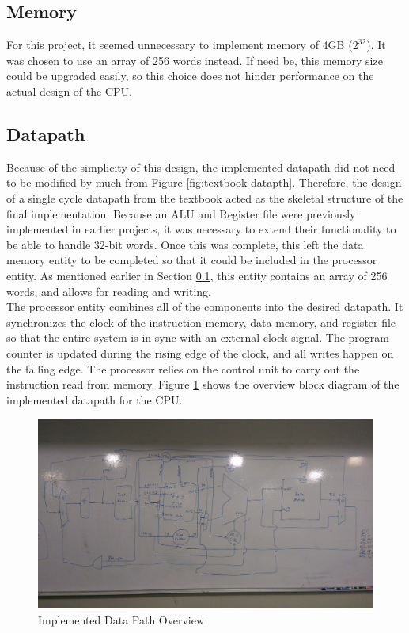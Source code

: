 \documentclass[12pt]{article}
\begin{document}
\subsection{Memory}\label{sec:memory}
For this project, it seemed unnecessary to implement memory of 4GB ($2^{32}$). It was chosen to use an array of 256 words instead. If need be, this memory size could be upgraded easily, so this choice does not hinder performance on the actual design of the CPU.
\subsection{Datapath}
Because of the simplicity of this design, the implemented datapath did not need to be modified by much from Figure \ref{fig:textbook-datapth}. Therefore, the design of a single cycle datapath from the textbook acted as the skeletal structure of the final implementation. Because an ALU and Register file were previously implemented in earlier projects, it was necessary to extend their functionality to be able to handle 32-bit words. Once this was complete, this left the data memory entity to be completed so that it could be included in the processor entity. As mentioned earlier in Section \ref{sec:memory}, this entity contains an array of 256 words, and allows for reading and writing.
\\

\noindent The processor entity combines all of the components into the desired datapath. It synchronizes the clock of the instruction memory, data memory, and register file so that the entire system is in sync with an external clock signal. The program counter is updated during the rising edge of the clock, and all writes happen on the falling edge. The processor relies on the control unit to carry out the instruction read from memory.
Figure \ref{fig:datapth} shows the overview block diagram of the implemented datapath for the CPU.
\begin{figure}[H]
\centering
\includegraphics[width=\linewidth]{datapth}
\caption{Implemented Data Path Overview}
\label{fig:datapth}
\end{figure}
\end{document}
